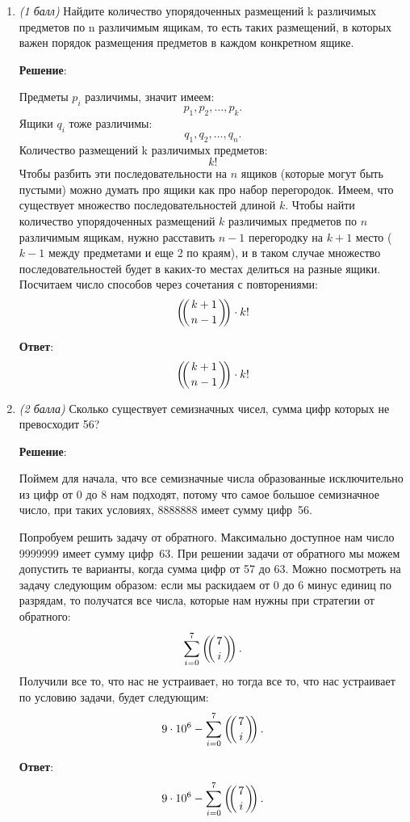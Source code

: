 \documentclass{article}
\def\multiset#1#2{\ensuremath{\left(\kern-.3em\left(\genfrac{}{}{0pt}{}{#1}{#2}\right)\kern-.3em\right)}}
\begin{document}
\begin{enumerate}
\begin{itemize}
    \end{itemize}
  \item \textit{(1 балл)} Найдите количество упорядоченных размещений k различимых предметов по n различимым ящикам, то есть таких размещений, в которых важен порядок размещения предметов в каждом конкретном ящике.
    
    \textbf{Решение}:

    Предметы $p_i$ различимы, значит имеем:
    \begin{equation}
      p_1, p_2, \ldots, p_k.
    \end{equation}
    Ящики $q_i$ тоже различимы:
    \begin{equation}
      q_1, q_2, \ldots, q_n.
    \end{equation}
    Количество размещений k различимых предметов:
    \begin{equation}
      k!
    \end{equation}
    Чтобы разбить эти последовательности на $n$ ящиков (которые могут быть пустыми) можно думать про ящики как про набор перегородок. Имеем, что существует множество последовательностей длиной $k$. Чтобы найти количество упорядоченных размещений $k$ различимых предметов по $n$ различимым ящикам, нужно расставить $n - 1$ перегородку на $k + 1$ место ($k - 1$ между предметами и еще 2 по краям), и в таком случае множество последовательностей будет в каких-то местах делиться на разные ящики. Посчитаем число способов через сочетания с повторениями:
    \begin{equation}
      \multiset{k + 1}{n - 1} \cdot k!
    \end{equation}

    \textbf{Ответ}:
    $$\multiset{k + 1}{n - 1} \cdot k!$$

  \item \textit{(2 балла)} Сколько существует семизначных чисел, сумма цифр которых не превосходит 56?
  
    \textbf{Решение}:

    Поймем для начала, что все семизначные числа образованные исключительно из цифр от 0 до 8 нам подходят, потому что самое большое семизначное число, при таких условиях, 8888888 имеет сумму цифр~56.
    
    Попробуем решить задачу от обратного. Максимально доступное нам число 9999999 имеет сумму цифр~63. При решении задачи от обратного мы можем допустить те варианты, когда сумма цифр от 57 до 63. Можно посмотреть на задачу следующим образом: если мы раскидаем от 0 до 6 минус единиц по разрядам, то получатся все числа, которые нам нужны при стратегии от обратного:
    \begin{equation}
      \sum_{i = 0}^{7} \multiset{7}{i}.
    \end{equation}
    Получили все то, что нас не устраивает, но тогда все то, что нас устраивает по условию задачи, будет следующим:
    \begin{equation}
      9 \cdot 10^6 - \sum_{i = 0}^{7} \multiset{7}{i}.
    \end{equation}

    \textbf{Ответ}:
    $$9 \cdot 10^6 - \sum_{i = 0}^{7} \multiset{7}{i}.$$
  \end{enumerate}
\end{document}
